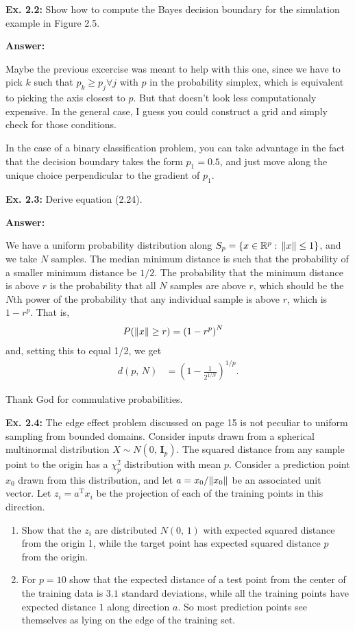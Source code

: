 \documentclass{article}
\begin{document}
\textbf{Ex. 2.2: }Show how to compute the Bayes decision boundary for the simulation example in Figure 2.5.

\textbf{Answer:}

Maybe the previous excercise was meant to help with this one, since we have to pick $k$ such that $p_k\geq p_j\forall j$ with $p$ in the probability simplex, which is equivalent to picking the axis closest to $p$. But that doesn't look less computationaly expensive. In the general case, I guess you could construct a grid and simply check for those conditions.

In the case of a binary classification problem, you can take advantage in the fact that the decision boundary takes the form $p_1=0.5$, and just move along the unique choice perpendicular to the gradient of $p_1$.

\textbf{Ex. 2.3: }Derive equation (2.24).

\textbf{Answer:}

We have a uniform probability distribution along $S_p=\{x\in\mathbb R^p:\,\norm{x}\leq1\}$, and we take $N$ samples. The median minimum distance is such that the probability of a smaller minimum distance be $1/2$. The probability that the minimum distance is above $r$ is the probability that all $N$ samples are above $r$, which should be the $N$th power of the probability that any individual sample is above $r$, which is $1-r^p$. That is,
\begin{align}
	P(\norm{x}\geq r)&=\left(1-r^p\right)^N
\end{align}
and, setting this to equal 1/2, we get
\begin{align}
	d(p,\,N)&=\left(1-\frac{1}{2^{1/N}}\right)^{1/p}.
\end{align}

Thank God for commulative probabilities.

\textbf{Ex. 2.4: }The edge effect problem discussed on page 15 is not peculiar to uniform sampling from bounded domains. Consider inputs drawn from a spherical multinormal distribution $X\sim N(0,\,\mathbf I_p)$. The squared distance from any sample point to the origin has a $\chi^2_p$ distribution with mean $p$. Consider a prediction point $x_0$ drawn from this distribution, and let $a=x_0/\norm{x_0}$ be an associated unit vector. Let $z_i=a^{\mathrm T}x_i$ be the projection of each of the training points in this direction.
\begin{enumerate}[label=\alph*]
	\item Show that the $z_i$ are distributed $N(0,\,1)$ with expected squared distance from the origin 1, while the target point has expected squared distance $p$ from the origin.
	\item For $p=10$ show that the expected distance of a test point from the center of the training data is $3.1$ standard deviations, while all the training points have expected distance $1$ along direction $a$. So most prediction points see themselves as lying on the edge of the training set.
\end{enumerate}
\end{document}
